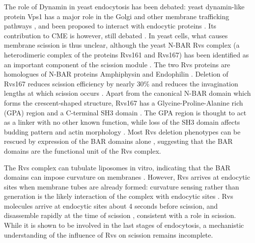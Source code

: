 \documentclass[9pt,lineno]{elife}
\begin{document}
The role of Dynamin in yeast endocytosis has been debated:  yeast dynamin-like protein Vps1 has a major role in the Golgi and other membrane trafficking pathways \citep{Rothman1990,Peters2004,Hoepfner2001}, and been proposed to interact with endocytic proteins \citep{Nannapaneni2010b, Yu2004,Smaczynska-deRooij2012}. Its contribution to CME is however, still debated \citep{GoudGadila2017,Kishimoto2011}. In yeast cells, what causes membrane scission is thus unclear, although the yeast N-BAR Rvs complex (a heterodimeric complex of the proteins Rvs161 and Rvs167) has been identified as an important component of the scission module \citep{Munn1995,Kaksonen2005,DHondt2000,Kishimoto2011}. The two Rvs proteins are homologues of N-BAR proteins Amphiphysin and Endophilin \citep{Friesen2006,Youn2010}. Deletion of Rvs167 reduces scission efficiency by nearly 30\% and reduces the invagination lengths at which scission occurs \citep{Kaksonen2005,Kukulski2012}. Apart from the canonical N-BAR domain which forms the crescent-shaped structure,  Rvs167 has a Glycine-Proline-Alanine rich (GPA) region and a C-terminal SH3 domain \citep{Sivadon1997}. The GPA region is thought to act as a linker with no other known function, while loss of the SH3 domain affects budding pattern and actin morphology \citep{Sivadon1997}. Most Rvs deletion phenotypes can be rescued by expression of the BAR domains alone \citep{Sivadon1997}, suggesting that the BAR domains are the functional unit of the Rvs complex.

The Rvs complex can tubulate liposomes in vitro, indicating that the BAR domains can impose curvature on membranes \citep{Youn2010}. However, Rvs arrives at endocytic sites when membrane tubes are already formed: curvature sensing rather than generation is the likely interaction of the complex with endocytic sites \citep{Kukulski2012,Picco2015}. Rvs molecules arrive at endocytic sites about 4 seconds before scission, and disassemble rapidly at the time of scission \citep{Picco2015}, consistent with a role in scission. While it is shown to be involved in the last stages of endocytosis, a mechanistic understanding of the influence of Rvs on scission remains incomplete. 
\end{document}
